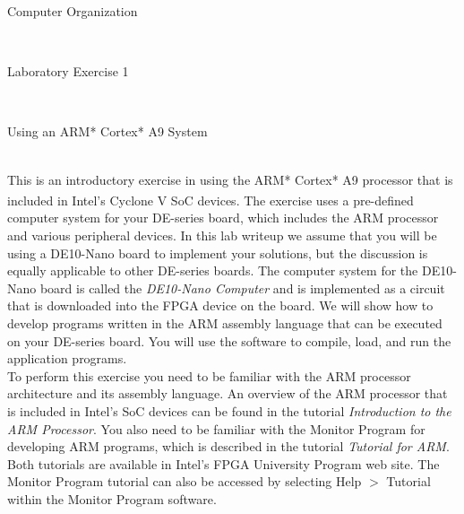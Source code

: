 \documentclass[epsfig,10pt,fullpage]{article}
\newcommand{\LabNum}{1}
\begin{document}
\centerline{\huge Computer Organization}
~\\
\centerline{\huge Laboratory Exercise \LabNum}
~\\
\centerline{\large Using an ARM* Cortex* A9 System}
~\\

\noindent
This is an introductory exercise in using the ARM* Cortex* A9 processor
that is included in Intel's Cyclone\textsuperscript{\textregistered} V SoC devices. The exercise uses a pre-defined computer 
system for your DE-series board, which includes the ARM processor and various peripheral devices.
In this lab writeup we assume that you will be using a DE10-Nano board to implement your
solutions, but the discussion is equally applicable to other DE-series boards.
The computer system for the DE10-Nano board is called the 
{\it DE10-Nano Computer} and is implemented as a circuit that is downloaded into the FPGA device 
on the board. We will show how to develop programs written in the ARM assembly language that can 
be executed on your DE-series board. You will use the {\it \productNameMedTM{}} software to compile,
load, and run the application programs. 
~\\

\noindent
To perform this exercise you need to be familiar with the ARM processor architecture and its 
assembly language. An overview of the ARM processor that is included in Intel's SoC devices
can be found in the tutorial {\it Introduction to the ARM Processor}. You also need to be 
familiar with the Monitor Program for developing ARM programs, which is described in 
the tutorial {\it \productNameMed{} Tutorial for ARM}.  Both tutorials are available in 
Intel's FPGA University Program web site. The Monitor Program tutorial can also be accessed by 
selecting {\sf Help $>$ Tutorial} within the Monitor Program software.
\end{document}
